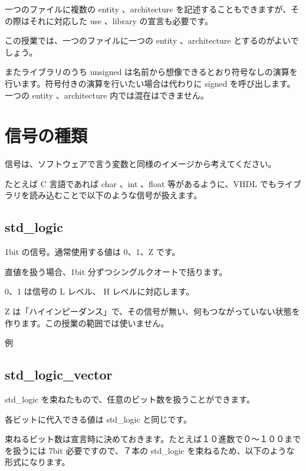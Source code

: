 \documentclass[letterpaper,10pt,dvipdfmx]{sphinxmanual}
\begin{document}
一つのファイルに複数の entity 、architecture を記述することもできますが、その際はそれに対応した use 、library の宣言も必要です。

この授業では、一つのファイルに一つの entity 、architecture とするのがよいでしょう。

またライブラリのうち unsigned は名前から想像できるとおり符号なしの演算を行います。符号付きの演算を行いたい場合は代わりに signed を呼び出します。一つの entity 、architecture 内では混在はできません。


\section{信号の種類}
\label{\detokenize{04_vhdl:id4}}
信号は、ソフトウェアで言う変数と同様のイメージから考えてください。

たとえば C 言語であれば char 、int 、float 等があるように、VHDL でもライブラリを読み込むことで以下のような信号が扱えます。


\subsection{std\_logic}
\label{\detokenize{04_vhdl:std-logic}}
1bit の信号。通常使用する値は 0、1、Z です。

直値を扱う場合、1bit 分ずつシングルクオートで括ります。

0、1 は信号の L レベル、 H レベルに対応します。

Z は「ハイインピーダンス」で、その信号が無い、何もつながっていない状態を作ります。この授業の範囲では使いません。

例

\begin{sphinxVerbatim}[commandchars=\\\{\}]
         
\end{sphinxVerbatim}


\subsection{std\_logic\_vector}
\label{\detokenize{04_vhdl:std-logic-vector}}
std\_logic を束ねたもので、任意のビット数を扱うことができます。

各ビットに代入できる値は std\_logic と同じです。

束ねるビット数は宣言時に決めておきます。たとえば１０進数で０～１００までを扱うには 7bit 必要ですので、７本の std\_logic を束ねるため、以下のような形式になります。
\end{document}
